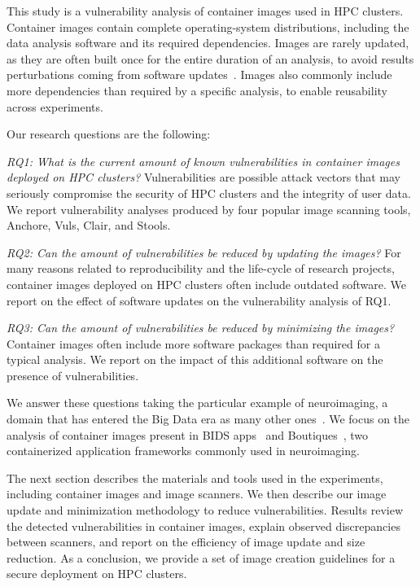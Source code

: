 \documentclass[a4paper,num-refs]{oup-contemporary}
\begin{document}
This study is a vulnerability analysis of container images used in HPC
clusters. Container images contain complete operating-system distributions, including
the data analysis software and its required dependencies.
Images are rarely updated, as they are often built once
for the entire duration of an analysis, to avoid results perturbations
coming from software updates~\cite{gronenschild2012effects, glatard2015reproducibility}. Images also
commonly include more dependencies than required by a specific analysis, to 
enable reusability across experiments.

Our research questions are the following:

\textit{RQ1: What is the current amount of known vulnerabilities in
container images deployed on HPC clusters?} Vulnerabilities are possible
attack vectors that may seriously compromise the security of HPC clusters
and the integrity of user data. We report vulnerability analyses produced
by four popular image scanning tools, Anchore, Vuls, Clair, and Stools.

\textit{RQ2: Can the amount of vulnerabilities be reduced by updating the images?}  
For many reasons related to reproducibility and the life-cycle of research
projects, container images deployed on HPC clusters often include outdated
software. We report on the effect of software updates on the vulnerability
analysis of RQ1.

\textit{RQ3: Can the amount of vulnerabilities be reduced by minimizing the images?} 
Container images often include more software packages than required for a
typical analysis. We report on the impact of this additional software on
the presence of vulnerabilities.

We answer these questions taking the particular example of neuroimaging, a
domain that has entered the Big Data era as many other
ones~\cite{van2014human}. We focus on the analysis of container images
present in BIDS apps~\cite{gorgolewski2017bids} and Boutiques~\cite{glatard2018boutiques}, two containerized
application frameworks commonly used in neuroimaging. 

The next section describes the materials and tools used in the experiments,
including container images and image scanners. We then describe our image
update and minimization methodology to reduce vulnerabilities. Results review
the detected vulnerabilities in container images, explain observed
discrepancies between scanners, and report on the efficiency of image
update and size reduction. As a conclusion, we provide a set of image
creation guidelines for a secure deployment on HPC clusters.
\end{document}
